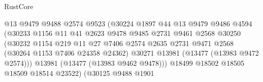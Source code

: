 \begin{lexlean}{RustCore}
\begin{coremodule}
                                          @13
                                          @9479
                                          @9488
                                          @2574
                                          @9523
                                          (@30224
                                            @1897
                                            @44
                                            @13
                                            @9479
                                            @9486
                                            @4594
                                            (@30233
                                              @1156
                                              @11
                                              @41
                                              @2623
                                              @9478
                                              @9485
                                              @2731
                                              @9461
                                              @2568
                                              @30250
                                              (@30232
                                                @1154
                                                @219
                                                @11
                                                @27
                                                @7406
                                                @2574
                                                @2635
                                                @2731
                                                @9471
                                                @2568
                                                (@30264 @1153 @7406 @24358 @24362)
                                                @30271
                                                @13981
                                                (@13477 (@13983 @9472 @2574)))
                                              @13981
                                              (@13477 (@13983 @9462 @9478)))
                                            @18499
                                            @18502
                                            @18505
                                            @18509
                                            @18514
                                            @23522)
                                          (@30125
                                            @9488
                                            @1901

\end{coremodule}
\end{lexlean}
